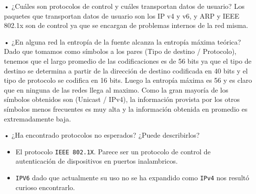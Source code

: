 • ¿Cuáles son protocolos de control y cuáles transportan datos de usuario?
Los paquetes que transportan datos de usuario son los IP v4 y v6, y ARP y IEEE 802.1x son de control ya que se encargan de problemas internos de la red misma.


• ¿En alguna red la entropía de la fuente alcanza la entropía máxima teórica?
Dado que tomamos como símbolos a los pares (Tipo de destino / Protocolo), tenemos que el largo promedio de las codificaciones es de 56 bits ya que el tipo de destino se determina a partir de la dirección de destino codificada en 40 bits y el tipo de protocolo se codifica en 16 bits. Luego la entropía máxima es 56 y es claro que en ninguna de las redes llega al maximo. Como la gran mayoría de los símbolos obtenidos son (Unicast / IPv4), la información provista por los otros símbolos menos frecuentes es muy alta y la información obtenida en promedio es extremadamente baja.


• ¿Ha encontrado protocolos no esperados? ¿Puede describirlos?
\begin{itemize}
    \item El protocolo \texttt{IEEE 802.1X}. Parece ser un protocolo de control de autenticación de dispositivos en puertos inalambricos.
    \item \texttt{IPV6} dado que actualmente su uso no se ha expandido como \texttt{IPv4} nos resultó curioso encontrarlo.
\end{itemize}
